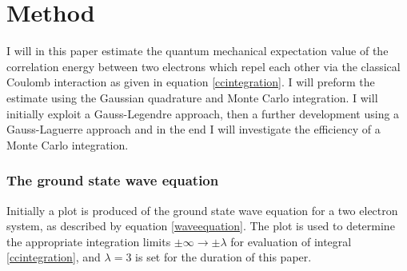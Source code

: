 \documentclass[%
reprint,
amsmath,amssymb,
aps,
]{revtex4-1}
\begin{document}
\section{Method}\noindent 
I will in this paper estimate the quantum mechanical expectation value of the correlation energy between two electrons which repel each other via the classical Coulomb interaction as given in equation \ref{ccintegration}. I will preform the estimate using the Gaussian quadrature and Monte Carlo integration. I will initially exploit a Gauss-Legendre approach, then a further development using a Gauss-Laguerre approach and in the end I will investigate the efficiency of a Monte Carlo integration. 
\subsubsection*{The ground state wave equation} \noindent 
Initially a plot is produced of the ground state wave equation for a two electron system, as described by equation \ref{waveequation}. The plot is used to determine the appropriate integration limits $\pm \infty \rightarrow \pm \lambda$ for evaluation of integral \ref{ccintegration}, and $\lambda = 3$ is set for the duration of this paper.  
\end{document}
